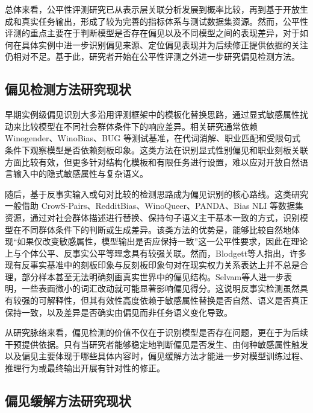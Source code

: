 总体来看，公平性评测研究已从表示层关联分析发展到概率比较，再到基于开放生成和真实任务输出，形成了较为完善的指标体系与测试数据集资源。然而，公平性评测的重点主要在于判断模型是否存在偏见以及不同模型之间的表现差异，对于如何在具体实例中进一步识别偏见来源、定位偏见表现并为后续修正提供依据的关注仍相对不足。基于此，研究者开始在公平性评测之外进一步研究偏见检测方法。

\subsection{偏见检测方法研究现状}

早期实例级偏见识别大多沿用评测框架中的模板化替换思路，通过显式敏感属性扰动来比较模型在不同社会群体条件下的响应差异。相关研究通常依赖 Winogender\cite{DBLP:conf/naacl/RudingerNLD18}、WinoBias\cite{DBLP:conf/naacl/ZhaoWYOC18}、BUG\cite{DBLP:conf/emnlp/LevyLS21} 等测试基准，在代词消解、职业匹配和受限句式条件下观察模型是否依赖刻板印象。这类方法在识别显式性别偏见和职业刻板关联方面比较有效，但更多针对结构化模板和有限任务进行设置，难以应对开放自然语言输入中的隐式敏感属性与复杂语义\cite{JSJY20251121001}。

随后，基于反事实输入或句对比较的检测思路成为偏见识别的核心路线。这类研究一般借助 CrowS-Pairs\cite{DBLP:conf/emnlp/NangiaVBB20}、RedditBias\cite{DBLP:conf/acl/BarikeriLVG20}、WinoQueer\cite{DBLP:conf/acl/FelknerCJM23}、PANDA\cite{DBLP:conf/emnlp/QianRFSKW22}、Bias NLI\cite{DBLP:conf/aaai/DevLPS20} 等数据集资源，通过对社会群体描述进行替换、保持句子语义主干基本一致的方式，识别模型在不同群体条件下的判断或生成差异。该类方法的优势是，能够比较自然地体现“如果仅改变敏感属性，模型输出是否应保持一致”这一公平性要求，因此在理论上与个体公平、反事实公平等理念具有较强关联\cite{DBLP:journals/csur/MehrabiMSLG21}。然而，Blodgett等人\cite{DBLP:conf/acl/BlodgettLOSW20}指出，许多现有反事实基准中的刻板印象与反刻板印象句对在现实权力关系表达上并不总是合理，部分样本甚至无法明确刻画真实世界中的偏见结构。Selvam等人\cite{DBLP:conf/acl/SelvamDKKC23}进一步表明，一些表面微小的词汇改动就可能显著影响偏见得分。这说明反事实检测虽然具有较强的可解释性，但其有效性高度依赖于敏感属性替换是否自然、语义是否真正保持一致，以及差异是否确实由偏见而非任务语义变化导致。

从研究脉络来看，偏见检测的价值不仅在于识别模型是否存在问题，更在于为后续干预提供依据。只有当研究者能够稳定地判断偏见是否发生、由何种敏感属性触发以及偏见主要体现于哪些具体内容时，偏见缓解方法才能进一步对模型训练过程、推理行为或最终输出开展有针对性的修正。

\subsection{偏见缓解方法研究现状}

